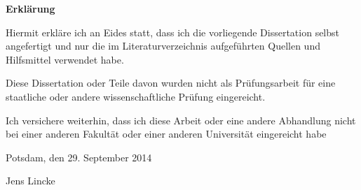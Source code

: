 \vfill {\centering \textbf{Erklärung}} 

\vspace{3ex}

{\centering Hiermit erkläre ich an Eides statt, dass ich die vorliegende Dissertation selbst angefertigt und nur die im Literaturverzeichnis aufgeführten Quellen und Hilfsmittel verwendet habe.}

\vspace{2ex}

{\centering Diese Dissertation oder Teile davon wurden nicht als Prüfungsarbeit für eine staatliche oder andere wissenschaftliche Prüfung eingereicht. }

\vspace{2ex}

{\centering Ich versichere weiterhin, dass ich diese Arbeit oder eine andere Abhandlung nicht bei einer anderen Fakultät oder einer anderen Universität eingereicht habe}

\vspace{9ex}

{\centering Potsdam, den 29. September 2014}

\vspace{9ex}

{\centering Jens Lincke}



